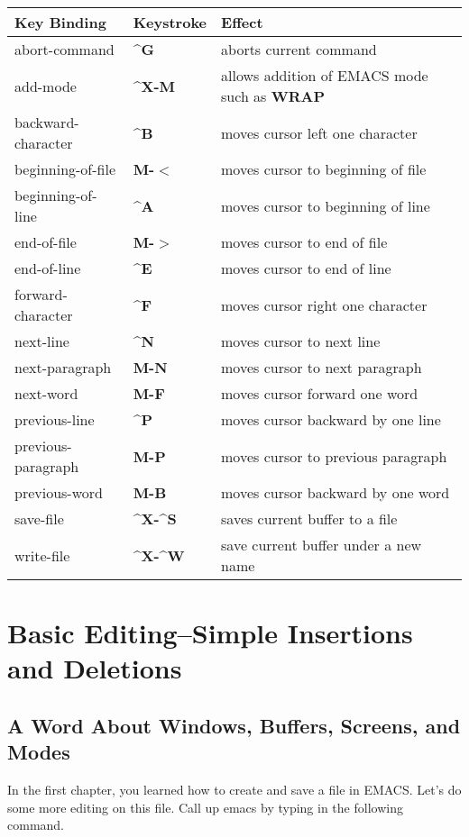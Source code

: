 \begin{tabular}{llp{4in}}
Key Binding & Keystroke & Effect \\ \hline
abort-command & {\bf{}\^{}G} & aborts current command \\
add-mode & {\bf{}\^{}X-M} & allows addition of EMACS
mode such as {\bf{}WRAP}\\
backward-character & {\bf{}\^{}B} & moves cursor left one character\\
beginning-of-file & {\bf{}M-$<${}} & moves cursor to beginning of file\\
beginning-of-line & {\bf{}\^{}A} & moves cursor to beginning of line\\
end-of-file & {\bf{}M-$>${}} & moves cursor to end of file\\
end-of-line & {\bf{}\^{}E} & moves cursor to end of line\\
forward-character & {\bf{}\^{}F} & moves cursor right one character\\
next-line & {\bf{}\^{}N} & moves cursor to next line\\
next-paragraph & {\bf{}M-N} & moves cursor to next paragraph\\
next-word & {\bf{}M-F} & moves cursor forward one word\\
previous-line & {\bf{}\^{}P} & moves cursor backward by one line\\
previous-paragraph & {\bf{}M-P} & moves cursor to previous paragraph\\
previous-word & {\bf{}M-B} & moves cursor backward by one word\\
save-file & {\bf{}\^{}X-\^{}S} & saves current buffer to a file\\
write-file & {\bf{}\^{}X-\^{}W} & save current buffer under a new name\\
\end{tabular}
\chapter{Basic Editing--Simple Insertions and Deletions}

\section{A Word About Windows, Buffers, Screens, and Modes}

In the first chapter, you learned how to create and save a file in
EMACS.  Let's do some more editing on this file.  Call up emacs by
typing in the following command.

